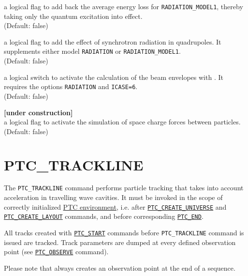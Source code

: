 \begin{madlist}
    a logical flag to add back the
   average energy loss for {\tt RADIATION\_MODEL1}, thereby taking only
   the quantum excitation into effect.\\ (Default: false)

    a logical flag to add the effect of
   synchrotron radiation in quadrupoles. It supplements either model
   {\tt RADIATION} or {\tt RADIATION\_MODEL1}. \\
   (Default: false)

    a logical switch to activate the calculation
   of the beam envelopes with \ptc. It requires the options
   {\tt RADIATION} and {\tt ICASE=6}.\\
   (Default: false)

    {\bf [under construction]}\\
     a logical flag to activate the simulation of space charge forces
     between particles. \\ (Default: false)  
\end{madlist}


\section{PTC\_TRACKLINE}
\label{sec:ptc_trackline}

The {\tt PTC\_TRACKLINE} command performs particle tracking that takes
into account acceleration in travelling wave cavities. 
It must be invoked in the scope of correctly initialized
\hyperref[chap:ptc_setup]{PTC environment}, 
i.e. after \hyperref[sec:ptc_create_universe]{\tt PTC\_CREATE\_UNIVERSE}
and \hyperref[sec:ptc_create_layout]{\tt PTC\_CREATE\_LAYOUT} commands, and before
corresponding \hyperref[sec:ptc_end]{\tt PTC\_END}. 

All tracks created with \hyperref[sec:ptc_start]{\tt PTC\_START}
commands before {\tt PTC\_TRACKLINE} command is issued are 
tracked. Track parameters are dumped at every defined observation point
(see \hyperref[sec:ptc_observe]{\tt PTC\_OBSERVE} command). 

Please note that \madx always creates an observation point at the end of a
sequence.


